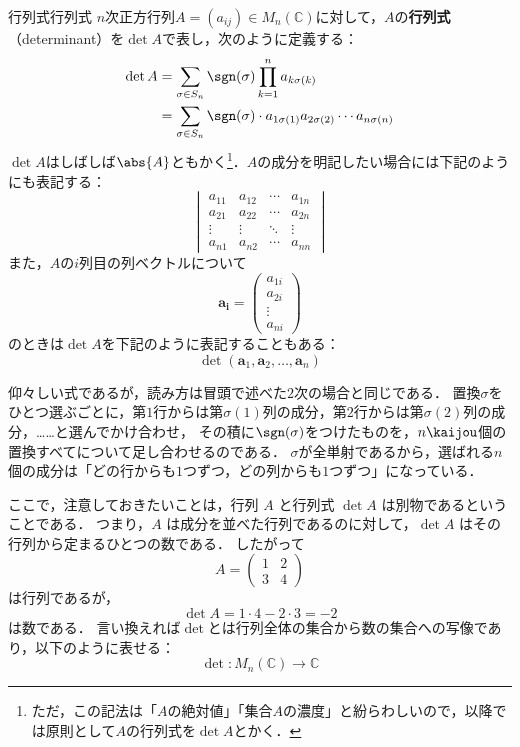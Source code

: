 \begin{definition}{行列式}{行列式}
  $n$次正方行列$A = (a_{ij}) \in M_n(\mathbb{C})$に対して，$A$の\textbf{行列式}（determinant）を$\det A $で表し，次のように定義する：
  \begin{align*}
  \det A &=\sum_{\sigma \in S_n} \sgn(\sigma) \prod_{k=1}^n a_{k\sigma(k)} \\
  &=  \sum_{\sigma \in S_n} \sgn(\sigma) \cdot a_{1\sigma(1)} a_{2\sigma(2)} \dotsm a_{n\sigma(n)}
  \end{align*}
  $\det A$はしばしば$\abs{A}$ともかく\footnote{ただ，この記法は「$A$の絶対値」「集合$A$の濃度」と紛らわしいので，以降では原則として$A$の行列式を$\det A$とかく．}．$A$の成分を明記したい場合には下記のようにも表記する：
  \[
  \begin{vmatrix}
  a_{11}  & a_{12}  & \cdots & a_{1n} \\
  a_{21}  & a_{22}  & \cdots & a_{2n} \\
  \vdots  & \vdots  & \ddots & \vdots \\
  a_{n1}  & a_{n2}  & \cdots & a_{nn}
  \end{vmatrix}
  \]
  また，$A$の$i$列目の列ベクトルについて
  \[
   \bm{a_i} =\begin{pmatrix} a_{1i}\\ a_{2i}  \\ \vdots \\ a_{ni} \end{pmatrix}
  \]
  のときは$\det A$を下記のように表記することもある：
  \[
  \det(\bm{a}_1, \bm{a}_2, \dots, \bm{a}_n)
  \]
\end{definition}

仰々しい式であるが，読み方は冒頭で述べた$2$次の場合と同じである．
置換$\sigma$をひとつ選ぶごとに，第$1$行からは第$\sigma(1)$列の成分，第$2$行からは第$\sigma(2)$列の成分，……と選んでかけ合わせ，
その積に$\sgn(\sigma)$をつけたものを，$n\kaijou$個の置換すべてについて足し合わせるのである．
$\sigma$が全単射であるから，選ばれる$n$個の成分は「どの行からも$1$つずつ，どの列からも$1$つずつ」になっている．

ここで，注意しておきたいことは，行列 $A$ と行列式 $\det A$ は別物であるということである．
つまり，$A$ は成分を並べた行列であるのに対して，$\det A$ はその行列から定まるひとつの数である．
したがって
\[
A=\begin{pmatrix}
1 & 2\\
3 & 4
\end{pmatrix}
\]
は行列であるが，
\[
\det A=1\cdot4-2\cdot3=-2
\]
は数である．
言い換えれば$\det$とは行列全体の集合から数の集合への写像であり，以下のように表せる：
\[
\det \colon M_n(\mathbb{C}) \to \mathbb{C}
\]

